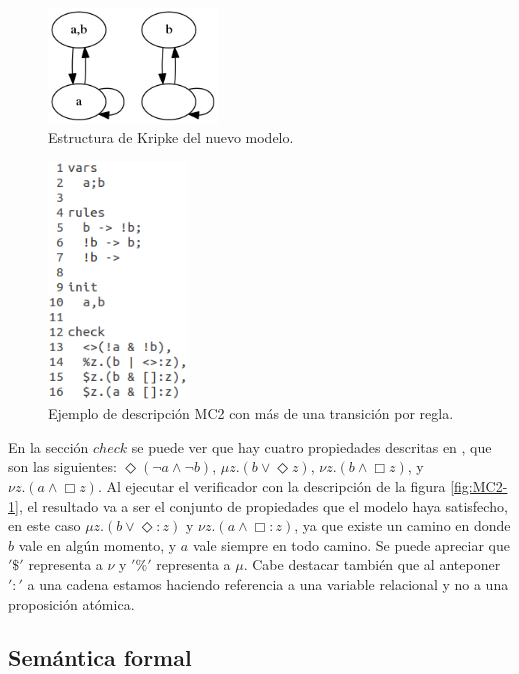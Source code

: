 \begin{figure}[H]
  \centering
  \includegraphics[width=0.4\textwidth]{Figures/kripke5.png}
  \caption{Estructura de Kripke del nuevo modelo.}
  \label{fig:kripke5}
\end{figure}

\begin{figure}[H]
  \centering
  \includegraphics[width=0.33\textwidth]{Figures/modeloMC2-3.png}
  \caption{Ejemplo de descripción MC2 con más de una transición por regla.}
  \label{fig:MC2-3}
\end{figure}

\noindent En la sección $check$ se puede ver que hay cuatro propiedades descritas en {\mucalculo}, que son las siguientes: $\Diamond (\neg a \land \neg b)$, $\mu z. (b \lor \Diamond z)$, $\nu z. (b \land \Box z)$, y $\nu z. (a \land \Box z)$. Al ejecutar el verificador con la descripción de la figura \ref{fig:MC2-1}, el resultado va a ser el conjunto de propiedades que el modelo haya satisfecho, en este caso $\mu z. (b \lor \Diamond : z)$ y $\nu z. (a \land \Box : z)$, ya que existe un camino en donde $b$ vale en algún momento, y $a$ vale siempre en todo camino. Se puede apreciar que $'\$'$ representa a $\nu$ y $'\%'$ representa a $\mu$. Cabe destacar también que al anteponer $':'$ a una cadena estamos haciendo referencia a una variable relacional y no a una proposición atómica.

\subsection{Semántica formal}

